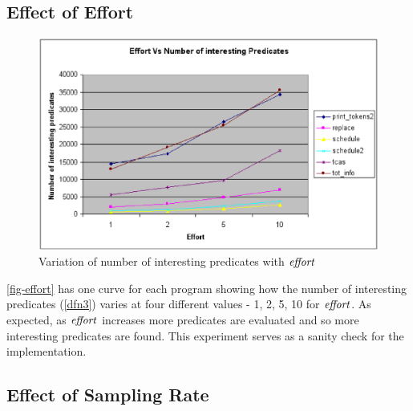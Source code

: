 \subsection{Effect of Effort}

\begin{figure}
  \centering
  \includegraphics{charts/effort}
  \caption{Variation of number of interesting predicates with $\mathit{effort}$}
  \label{fig-effort}
\end{figure}

\autoref{fig-effort} has one curve for each program showing how the number of interesting predicates (\autoref{dfn3}) varies at four different values - 1, 2, 5, 10 for $\mathit{effort}$.  As expected, as $\mathit{effort}$ increases more predicates are evaluated and so more interesting predicates are found.  This experiment serves as a sanity check for the implementation.

\subsection{Effect of Sampling Rate}
\label{sec-sampling}

